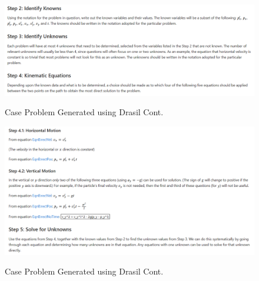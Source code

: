 \begin{figure}[h!]
	\caption{Case Problem Generated using Drasil Cont.}
	\includegraphics[width=1\textwidth]{figures/caseProb-4.png}
	\label{fig:caseProb-4}
\end{figure}

\begin{figure}[h!]
	\caption{Case Problem Generated using Drasil Cont.}
	\includegraphics[width=1\textwidth]{figures/caseProb-5.png}
	\label{fig:caseProb-5}
\end{figure}


